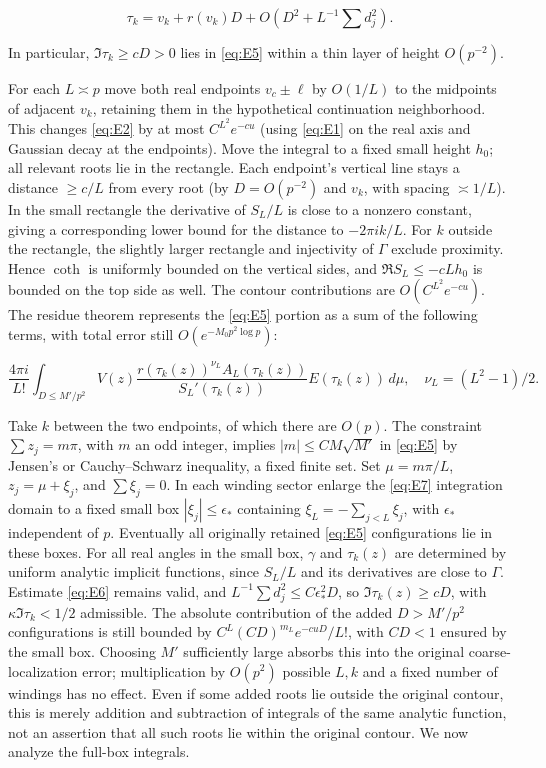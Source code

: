 \documentclass[11pt,a4paper]{article}
\numberwithin{equation}{section}
\theoremstyle{plain}
\theoremstyle{definition}
\begin{document}
\begin{equation}
\tau_k=v_k+r(v_k)D+O(D^2+L^{-1}\sum d_j^2).
\label{eq:E6}
\end{equation}

In particular, \(\Im\tau_k\ge cD>0\) lies in \eqref{eq:E5} within a thin layer of height \(O(p^{-2})\).

For each \(L\asymp p\) move both real endpoints \(v_c\pm\ell\) by \(O(1/L)\) to the midpoints of adjacent \(v_k\), retaining them in the hypothetical continuation neighborhood. This changes \eqref{eq:E2} by at most \(C^{L^2}e^{-c u}\) (using \eqref{eq:E1} on the real axis and Gaussian decay at the endpoints). Move the integral to a fixed small height \(h_0\); all relevant roots lie in the rectangle. Each endpoint's vertical line stays a distance \(\ge c/L\) from every root (by \(D=O(p^{-2})\) and \(v_k\), with spacing \(\asymp1/L\)). In the small rectangle the derivative of \(S_L/L\) is close to a nonzero constant, giving a corresponding lower bound for the distance to \(-2\pi ik/L\). For \(k\) outside the rectangle, the slightly larger rectangle and injectivity of \(\Gamma\) exclude proximity. Hence \(\coth\) is uniformly bounded on the vertical sides, and \(\Re S_L\le-c L h_0\) is bounded on the top side as well. The contour contributions are \(O(C^{L^2}e^{-c u})\). The residue theorem represents the \eqref{eq:E5} portion as a sum of the following terms, with total error still \(O(e^{-M_0p^2\log p})\):

\begin{equation}
\frac{4\pi i}{L!}\int_{D\le M'/p^2} V(z)\frac{r(\tau_k(z))^{\nu_L}A_L(\tau_k(z))}{S_L'(\tau_k(z))}E(\tau_k(z))\,d\mu,\quad \nu_L=(L^2-1)/2.
\label{eq:E7}
\end{equation}

Take \(k\) between the two endpoints, of which there are \(O(p)\). The constraint \(\sum z_j=m\pi\), with \(m\) an odd integer, implies \(|m|\le C M\sqrt{M'}\) in \eqref{eq:E5} by Jensen's or Cauchy--Schwarz inequality, a fixed finite set. Set \(\mu=m\pi/L\), \(z_j=\mu+\xi_j\), and \(\sum\xi_j=0\). In each winding sector enlarge the \eqref{eq:E7} integration domain to a fixed small box \(|\xi_j|\le\epsilon_*\) containing \(\xi_L=-\sum_{j<L}\xi_j\), with \(\epsilon_*\) independent of \(p\). Eventually all originally retained \eqref{eq:E5} configurations lie in these boxes. For all real angles in the small box, \(\gamma\) and \(\tau_k(z)\) are determined by uniform analytic implicit functions, since \(S_L/L\) and its derivatives are close to \(\Gamma\). Estimate \eqref{eq:E6} remains valid, and \(L^{-1}\sum d_j^2\le C\epsilon_*^2D\), so \(\Im\tau_k(z)\ge cD\), with \(\kappa\Im\tau_k<1/2\) admissible. The absolute contribution of the added \(D>M'/p^2\) configurations is still bounded by \(C^L(CD)^{m_L}e^{-c u D}/L!\), with \(CD<1\) ensured by the small box. Choosing \(M'\) sufficiently large absorbs this into the original coarse-localization error; multiplication by \(O(p^2)\) possible \(L,k\) and a fixed number of windings has no effect. Even if some added roots lie outside the original contour, this is merely addition and subtraction of integrals of the same analytic function, not an assertion that all such roots lie within the original contour. We now analyze the full-box integrals.
\end{document}

